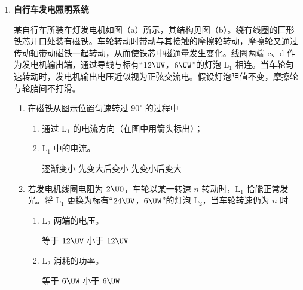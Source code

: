 \documentclass[\gkver]{gaokaozhenti}
\begin{document}
\begin{enumerate}
{（2）带电粒子在匀强磁场中运动周期 $T = \frac{2\pi m}{qB} \propto \frac{m}{q}$，因此 $\ce{^{1}_{1}H}$ 与 $\ce{^{3}_{1}H}$ 的运动周期之比为 1:3，$\ce{^{1}_{1}H}$ 完成 3 次加速时，$\ce{^{3}_{1}H}$ 只经历了 1 次加速。由动能定理 $qU = \Delta E_{k}$ 可得两个粒子的动能之比为 3:1。正确选项为 E。
}

\item
\textbf{自行车发电照明系统}

某自行车所装车灯发电机如图（a）所示，其结构见图（b）。绕有线圈的匚形铁芯开口处装有磁铁。车轮转动时带动与其接触的摩擦轮转动，摩擦轮又通过传动轴带动磁铁一起转动，从而使铁芯中磁通量发生变化。线圈两端 c、d 作为发电机输出端，通过导线与标有“$12 \UV$，$6 \UW$”的灯泡 L$_{1}$ 相连。当车轮匀速转动时，发电机输出电压近似视为正弦交流电。假设灯泡阻值不变，摩擦轮与轮胎间不打滑。



\begin{enumerate}
	\item
	在磁铁从图示位置匀速转过 $90^\circ$ 的过程中
	\begin{enumerate}
		\item
		通过 L$_{1}$ 的电流方向（在图中用箭头标出）；

		\item
		L$_{1}$ 中的电流。

		{逐渐变小}
		{先变大后变小}
		{先变小后变大}
	\end{enumerate}

	\item
	若发电机线圈电阻为 $2 \UO$，车轮以某一转速 $n$ 转动时，L$_{1}$ 恰能正常发光。将 L$_{1}$ 更换为标有“$24 \UV$，$6 \UW$”的灯泡 L$_{2}$，当车轮转速仍为 $n$ 时
	\begin{enumerate}
		\item
		L$_{2}$ 两端的电压。

		{等于 $12 \UV$}
		{小于 $12 \UV$}

		\item
		L$_{2}$ 消耗的功率。

		{等于 $6 \UW$}
		{小于 $6 \UW$}
	\end{enumerate}


\end{enumerate}
\end{enumerate}
\end{document}
